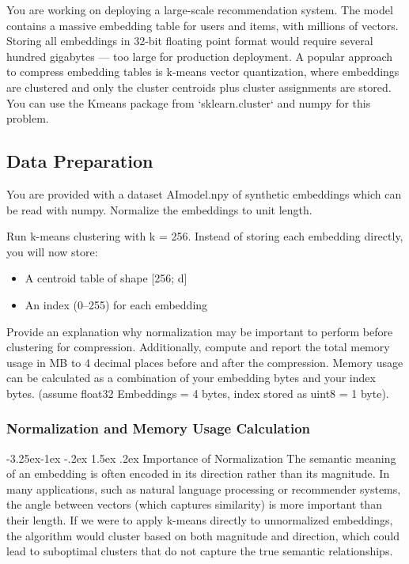 \documentclass[twoside, 10pt]{article}
\makeatletter
\renewcommand{\paragraph}{\@startsection{paragraph}{4}{\z@}%
    {-3.25ex\@plus -1ex \@minus -.2ex}%
    {1.5ex \@plus .2ex}%
    {\normalfont\normalsize\bfseries}}
\makeatother
\begin{document}
You are working on deploying a large-scale recommendation system. The model contains a massive embedding table for users and items, with millions of vectors. Storing all embeddings in 32-bit floating
point format would require several hundred gigabytes — too large for production deployment. A popular approach to compress embedding tables is k-means vector quantization, where embeddings are clustered
and only the cluster centroids plus cluster assignments are stored. You can use the Kmeans package from ‘sklearn.cluster‘ and numpy for this problem.

\subsection{Data Preparation}
You are provided with a dataset AImodel.npy of synthetic embeddings which can be read with numpy. Normalize the embeddings to unit length.

Run k-means clustering with k = 256. Instead of storing each embedding directly, you will now store:
\begin{itemize}
    \item A centroid table of shape [256; d]
    \item An index (0–255) for each embedding
\end{itemize}

Provide an explanation why normalization may be important to perform before clustering for compression. Additionally, compute and report the total memory usage in MB to 4 decimal places before and
after the compression. Memory usage can be calculated as a combination of your embedding bytes and your index bytes. (assume float32 Embeddings = 4 bytes, index stored as uint8 = 1 byte).

\subsubsection{Normalization and Memory Usage Calculation}
\paragraph{Importance of Normalization}
The semantic meaning of an embedding is often encoded in its direction rather than its magnitude. In many applications, such as natural language processing or recommender systems, the angle between vectors (which captures similarity) is more important than their length. If we were to apply k-means directly to unnormalized embeddings, the algorithm would cluster based on both magnitude and direction, which could lead to suboptimal clusters that do not capture the true semantic relationships.
\end{document}

